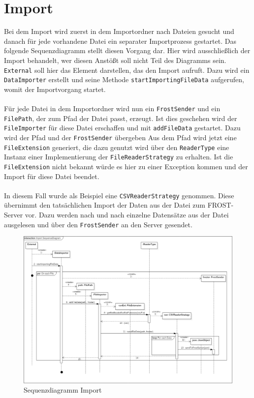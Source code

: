 \section{Import}
Bei dem Import wird zuerst in dem Importordner nach Dateien gesucht und danach für jede vorhandene Datei ein separater Importprozess gestartet. Das folgende Sequenzdiagramm stellt diesen Vorgang dar. Hier wird ausschließlich der Import behandelt, wer diesen Anstößt soll nicht Teil des Diagramms sein. \texttt{External} soll hier das Element darstellen, das den Import aufruft. Dazu wird ein \texttt{DataImporter} erstellt und seine Methode \texttt{startImportingFileData} aufgerufen, womit der Importvorgang startet.\\\\
Für jede Datei in dem Importordner wird nun ein \texttt{FrostSender} und ein \texttt{FilePath}, der zum Pfad der Datei passt, erzeugt. Ist dies geschehen wird der \texttt{FileImporter} für diese Datei erschaffen und mit \texttt{addFileData} gestartet. Dazu wird der Pfad und der \texttt{FrostSender} übergeben Aus dem Pfad wird jetzt eine \texttt{FileExtension} generiert, die dazu genutzt wird über den \texttt{ReaderType} eine Instanz einer Implementierung der \texttt{FileReaderStrategy} zu erhalten. Ist die \texttt{FileExtension} nicht bekannt würde es hier zu einer Exception kommen und der Import für diese Datei beendet.\\\\
In diesem Fall wurde als Beispiel eine \texttt{CSVReaderStrategy} genommen. Diese übernimmt den tatsächlichen Import der Daten aus der Datei zum FROST-Server vor. Dazu werden nach und nach einzelne Datensätze aus der Datei ausgelesen und über den \texttt{FrostSender} an den Server gesendet.
\begin{figure}[!hbp]
	\centering
	\includegraphics[width=0.9\linewidth]{images/import/ImportSequenceDiagram.png}
	\caption{Sequenzdiagramm Import}
\end{figure}
\newpage

